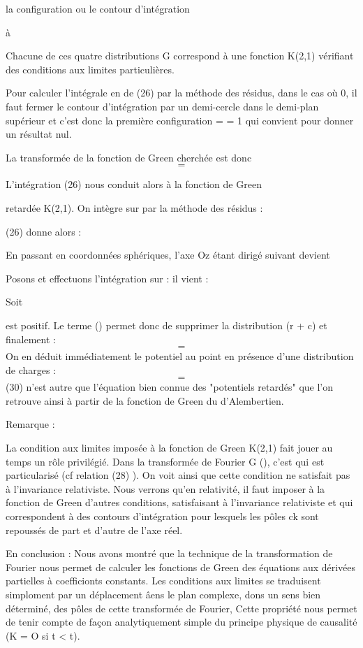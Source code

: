 la configuration ou le contour d'intégration

à

Chacune de ces quatre distributions G correspond à une fonction
K(2,1) vérifiant des conditions aux limites particulières.

Pour calculer l'intégrale en  de (26) par la méthode des résidus, dans
le cas où  0, il faut fermer le contour d'intégration par un
demi-cercle dans le demi-plan supérieur et c'est donc la première configuration  =  = 1 qui convient pour donner un résultat nul.

La transformée de la fonction de Green cherchée est donc
\[
\tag{28}=
\]

L'intégration (26) nous conduit alors à la fonction de Green

retardée K(2,1). On intègre sur  par la méthode des résidus :

(26) donne alors :

En passant en coordonnées sphériques, l'axe Oz étant dirigé suivant 
 devient
 
Posons  et effectuons l'intégration sur  : il
vient :

Soit 

 est positif. Le terme () permet donc de supprimer la
distribution (r + c) et finalement :
\[
\tag{29}=
\]
On en déduit immédiatement le potentiel au point  en présence d'une
distribution de charges  :
\[
\tag{30}=
\]
(30) n'est autre que l'équation bien connue des "potentiels retardés" que
l'on retrouve ainsi à partir de la fonction de Green du d'Alembertien.

Remarque :

La condition aux limites imposée à la fonction de Green K(2,1)
fait jouer au temps un rôle privilégié. Dans la transformée de Fourier
G (), c'est  qui est particularisé (cf relation (28) ). On voit ainsi
que cette condition ne satisfait pas à l'invariance relativiste. Nous verrons qu'en relativité, il faut imposer à la fonction de Green d'autres conditions, satisfaisant à l'invariance relativiste et qui correspondent à des
contours d'intégration pour lesquels les pôles ck sont repoussés de part
et d'autre de l'axe réel.

En conclusion : Nous avons montré que la technique de la transformation
de Fourier nous permet de calculer les fonctions de Green des équations
aux dérivées partielles à coefficionts constants. Les conditions aux
limites se traduisent simploment par un déplacement âens le plan complexe,
dons un sens bien déterminé, des pôles de cette transformée de Fourier,
Cette propriété nous permet de tenir compte de façon analytiquement simple
du principe physique de causalité (K = O si t < t).

